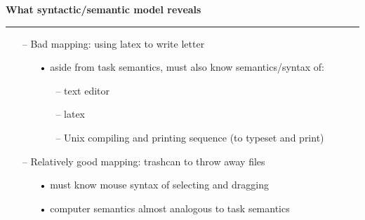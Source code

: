 \documentclass[pdf]{beamer}
\begin{document}
\begin{frame}
\vspace{8mm}
\textcolor{myBlue}{\textbf{\Large{What syntactic/semantic model reveals}}}

\textcolor{red}{\rule{10cm}{1mm}}

\begin{small}

\begin{itemize}
\item [\textcolor{black}{--}]Bad mapping: using latex to write letter
     \begin{itemize}
     \item [\textcolor{black}{•}]aside from task semantics, must also know semantics/syntax of:
            \begin{itemize}
            \item [\textcolor{black}{--}]text editor
            \item [\textcolor{black}{--}]latex
            \item [\textcolor{black}{--}]Unix compiling and printing sequence (to typeset and print)
            \end{itemize}
      \end{itemize}
      
\item [\textcolor{black}{--}]Relatively good mapping: trashcan to throw away files
     \begin{itemize}
     \item [\textcolor{black}{•}]must know mouse syntax of selecting and dragging
     \item [\textcolor{black}{•}]computer semantics almost analogous to task semantics
     \end{itemize}
\end{itemize}
\medskip
\end{small}
\end{frame}
\end{document}
